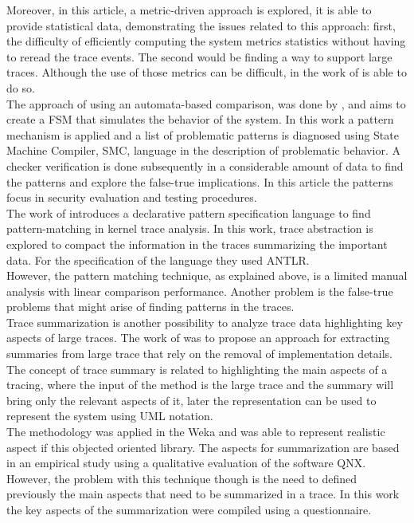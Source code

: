 Moreover, in this article, a metric-driven approach is explored, it is able to provide statistical data, demonstrating the issues related to this approach: first, the difficulty of efficiently computing the system metrics statistics without having to reread the trace events. The second would be finding a way to support large traces. Although the use of those metrics can be difficult, in the work of \cite{debugging_cluster} is able to do so.\\
The approach of using an automata-based comparison, was done by \cite{matni}, and aims to create a FSM  that simulates the behavior of the system. In this work a pattern mechanism is applied and a list of problematic patterns is diagnosed using State Machine Compiler, SMC, language in the description of problematic behavior. A checker verification is done subsequently in a considerable amount of data to find the patterns and explore the false-true implications. In this article the patterns focus in security evaluation and testing procedures. \\
The work of \cite{TraceFile} introduces a declarative pattern specification language to find pattern-matching in kernel trace analysis. In this work, trace abstraction is explored to compact the information in the traces summarizing the important data. For the specification of the language they used ANTLR.\\
However, the pattern matching technique, as explained above, is a limited manual analysis with linear comparison performance. Another problem is the false-true problems that might arise of finding patterns in the traces.\\
Trace summarization is another possibility to analyze trace data highlighting key aspects of large traces. The work of \cite{summarizing_traces} was to propose an approach for extracting summaries from large trace that rely on the removal of implementation details. The concept of trace summary is related to highlighting the main aspects of a tracing, where the input of the method is the large trace and the summary will bring only the relevant aspects of it, later the representation can be used to represent the system using UML notation. \\
The methodology was applied in the Weka \cite{weka} and was able to represent realistic aspect if this objected oriented library. The aspects for summarization are based in an empirical study using a qualitative evaluation of the software QNX. \\
However, the problem with this technique though is the need to defined previously the main aspects that need to be summarized in a trace. In this work the key aspects of the summarization were compiled using a questionnaire.\\
